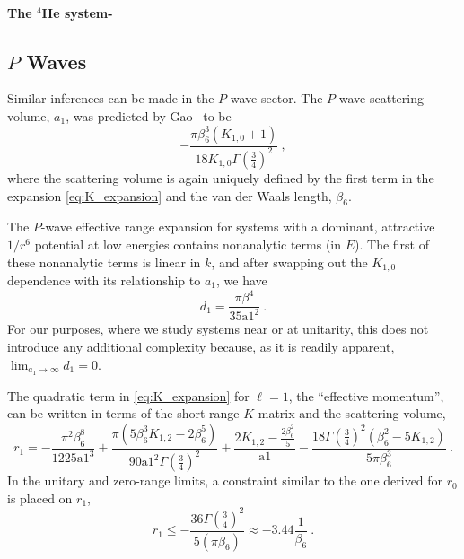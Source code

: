 \documentclass[aps,preprint,superscriptaddress]{revtex4-1}
\begin{document}
\paragraph{\bf The $^4$He system-  } 

\subsection{$P$ Waves}

Similar inferences can be made in the $P$-wave sector.  The $P$-wave
scattering volume, $a_1$, was predicted by Gao~\cite{PhysRevA.58.4222}
to be
\begin{equation}
  -\frac{\pi  \beta_6 ^3 (K_{1,0}+1)}{18 K_{1,0} \Gamma
  \left(\frac{3}{4}\right)^2}~,
\end{equation}
where the scattering volume is again uniquely defined by the first term in the
expansion \eqref{eq:K_expansion} and the van der Waals length, $\beta_6$.

The $P$-wave effective range expansion for systems with a dominant, attractive
$1/r^6$ potential at low energies contains nonanalytic terms (in $E$).
The first of these nonanalytic terms is linear in $k$, and after swapping out
the $K_{1,0}$ dependence with its relationship to $a_1$, we have
\begin{equation}
  d_1 = \frac{\pi  \beta ^4}{35 \text{a1}^2}~.
\end{equation}
For our purposes, where we study systems near or at unitarity, this does not
introduce any additional complexity because, as it is readily apparent,
$\lim_{a_1\rightarrow\infty}d_1=0$.

The quadratic term in \eqref{eq:K_expansion} for $\ell=1$, the ``effective
momentum'', can be written in terms of the short-range $K$ matrix and the
scattering volume,
\begin{equation}
  r_1 = -\frac{\pi ^2 \beta_6 ^8}{1225 \text{a1}^3}+\frac{\pi  \left(5 \beta_6
      ^3 K_{1,2}-2 \beta_6 ^5\right)}{90 \text{a1}^2 \Gamma
      \left(\frac{3}{4}\right)^2}+\frac{2 K_{1,2}-\frac{2 \beta_6
        ^2}{5}}{\text{a1}}-\frac{18 \Gamma \left(\frac{3}{4}\right)^2
        \left(\beta_6 ^2-5 K_{1,2}\right)}{5 \pi  \beta_6 ^3}~.
\end{equation}
In the unitary and zero-range limits, a constraint similar to the one derived
for $r_0$ is placed on $r_1$,
\begin{equation}
  r_1 \le -\frac{36 \Gamma \left(\frac{3}{4}\right)^2}{5 (\pi  \beta_6 )}
  \approx -3.44 \frac{1}{\beta_6}~.
\end{equation}
\end{document}
